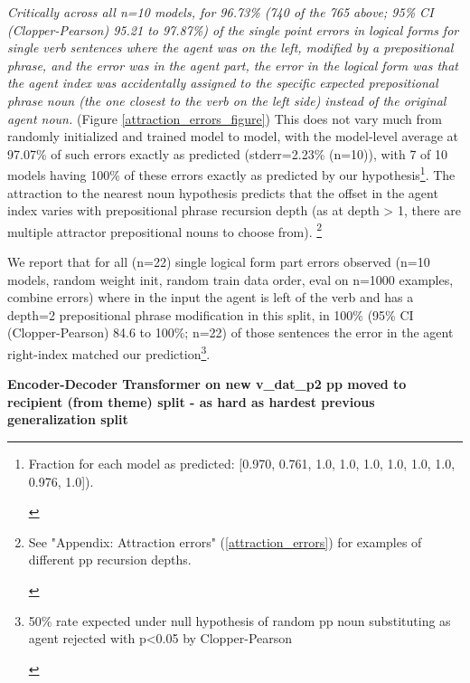 \documentclass[11pt]{article}
\begin{document}
\textit{Critically across all n=10 \citep{Wu2023} models, for 96.73\% (740 of the 765 above; 95\% CI (Clopper-Pearson) 95.21 to 97.87\%) of the single point errors in logical forms for single verb sentences where the agent was on the left, modified by a prepositional phrase, and the error was in the agent part, the error in the logical form was that the agent index was accidentally assigned to the specific expected prepositional phrase noun (the one closest to the verb on the left side) instead of the original agent noun.} (Figure \ref{attraction_errors_figure})
This does not vary much from randomly initialized and trained model to model, with the model-level average at 97.07\% of such errors exactly as predicted (stderr=2.23\% (n=10)), with 7 of 10 models having 100\% of these errors exactly as predicted by our hypothesis\footnote{\begin{footnotesize}Fraction for each model as predicted: [0.970, 0.761, 1.0, 
1.0, 1.0, 1.0, 1.0, 1.0, 0.976, 1.0]).
\end{footnotesize}
}.
The attraction to the nearest noun hypothesis predicts that the offset in the agent index varies with prepositional phrase recursion depth (as at depth > 1, there are multiple attractor prepositional nouns to choose from).
\footnote{\begin{footnotesize}See "Appendix: Attraction errors" (\ref{attraction_errors}) for examples of different pp recursion depths.
\end{footnotesize}
}

We report that for all (n=22) single logical form part errors observed (n=10 models, random weight init, random train data order, eval on n=1000 examples, combine errors) where in the input the agent is left of the verb and has a depth=2 prepositional phrase modification in this split, in 100\% (95\% CI (Clopper-Pearson) 84.6 to 100\%; n=22) of those sentences the error in the agent right-index matched our prediction\footnote{\begin{footnotesize}50\% rate expected under null hypothesis of random pp noun substituting as agent rejected with p<0.05 by Clopper-Pearson\end{footnotesize}}.\label{error_analysis_for_baseline_transformer_predict_and_confirm_attraction_errors}

\textbf{\citep{Wu2023} Encoder-Decoder Transformer on new v\_dat\_p2 pp moved to recipient (from theme) split - as hard as hardest previous generalization split}
\end{document}
